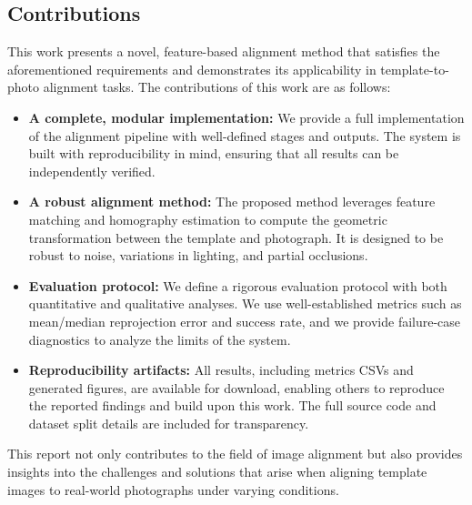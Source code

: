 \subsection{Contributions}
This work presents a novel, feature-based alignment method that satisfies the aforementioned requirements and demonstrates its applicability in template-to-photo alignment tasks. The contributions of this work are as follows:
\begin{itemize}
  \item \textbf{A complete, modular implementation:} We provide a full implementation of the alignment pipeline with well-defined stages and outputs. The system is built with reproducibility in mind, ensuring that all results can be independently verified.
  \item \textbf{A robust alignment method:} The proposed method leverages feature matching and homography estimation to compute the geometric transformation between the template and photograph. It is designed to be robust to noise, variations in lighting, and partial occlusions.
  \item \textbf{Evaluation protocol:} We define a rigorous evaluation protocol with both quantitative and qualitative analyses. We use well-established metrics such as mean/median reprojection error and success rate, and we provide failure-case diagnostics to analyze the limits of the system.
  \item \textbf{Reproducibility artifacts:} All results, including metrics CSVs and generated figures, are available for download, enabling others to reproduce the reported findings and build upon this work. The full source code and dataset split details are included for transparency.
\end{itemize}

This report not only contributes to the field of image alignment but also provides insights into the challenges and solutions that arise when aligning template images to real-world photographs under varying conditions.

